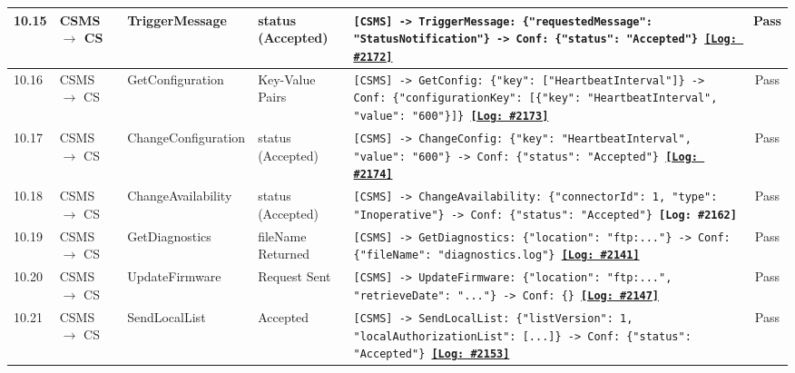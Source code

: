 \documentclass[10pt, a4paper, landscape]{article}
\begin{document}
\begin{longtable}{|p{1.0cm}|p{2.5cm}|p{4.0cm}|p{5.0cm}|p{10.0cm}|c|}
\hline
10.15 & CSMS $\to$ CS & TriggerMessage & status (Accepted) & \footnotesize\texttt{[CSMS] -> TriggerMessage: \{"requestedMessage": "StatusNotification"\} \newline [CS] -> Conf: \{"status": "Accepted"\} \newline \hyperref[log:10.15]{\textbf{[Log: \#2172]}}} & Pass \\
\hline
10.16 & CSMS $\to$ CS & GetConfiguration & Key-Value Pairs & \footnotesize\texttt{[CSMS] -> GetConfig: \{"key": ["HeartbeatInterval"]\} \newline [CS] -> Conf: \{"configurationKey": [\{"key": "HeartbeatInterval", "value": "600"\}]\} \newline \hyperref[log:10.16]{\textbf{[Log: \#2173]}}} & Pass \\
\hline
10.17 & CSMS $\to$ CS & ChangeConfiguration & status (Accepted) & \footnotesize\texttt{[CSMS] -> ChangeConfig: \{"key": "HeartbeatInterval", "value": "600"\} \newline [CS] -> Conf: \{"status": "Accepted"\} \newline \hyperref[log:10.17]{\textbf{[Log: \#2174]}}} & Pass \\
\hline
10.18 & CSMS $\to$ CS & ChangeAvailability & status (Accepted) & \footnotesize\texttt{[CSMS] -> ChangeAvailability: \{"connectorId": 1, "type": "Inoperative"\} \newline [CS] -> Conf: \{"status": "Accepted"\} \newline \textbf{[Log: \#2162]}} & Pass \\
\hline
10.19 & CSMS $\to$ CS & GetDiagnostics & fileName Returned & \footnotesize\texttt{[CSMS] -> GetDiagnostics: \{"location": "ftp:..."\} \newline [CS] -> Conf: \{"fileName": "diagnostics.log"\} \newline \hyperref[log:10.19]{\textbf{[Log: \#2141]}}} & Pass \\
\hline
10.20 & CSMS $\to$ CS & UpdateFirmware & Request Sent & \footnotesize\texttt{[CSMS] -> UpdateFirmware: \{"location": "ftp:...", "retrieveDate": "..."\} \newline [CS] -> Conf: \{\} \newline \hyperref[log:10.20]{\textbf{[Log: \#2147]}}} & Pass \\
\hline
10.21 & CSMS $\to$ CS & SendLocalList & Accepted & \footnotesize\texttt{[CSMS] -> SendLocalList: \{"listVersion": 1, "localAuthorizationList": [...]\} \newline [CS] -> Conf: \{"status": "Accepted"\} \newline \hyperref[log:10.21]{\textbf{[Log: \#2153]}}} & Pass \\

\end{longtable}
\end{document}
